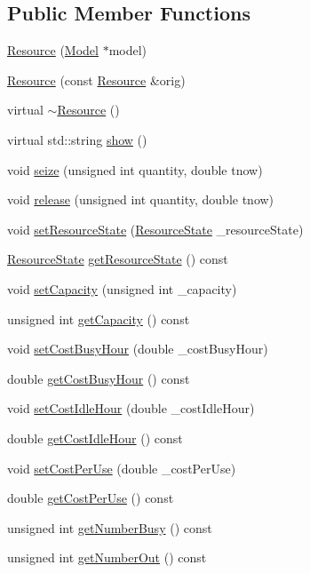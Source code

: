 \subsection*{Public Member Functions}
\begin{DoxyCompactItemize}
\item 
\hyperlink{class_resource_a1a8ae095067797fa47b0241ee278536c}{Resource} (\hyperlink{class_model}{Model} $\ast$model)
\item 
\hyperlink{class_resource_a30f2ca8f0617a6628ebd246b14b50566}{Resource} (const \hyperlink{class_resource}{Resource} \&orig)
\item 
virtual \hyperlink{class_resource_a0e5ec475e2601bdb33644468e86f6f10}{$\sim$\+Resource} ()
\item 
virtual std\+::string \hyperlink{class_resource_a593cf83404dc90706943b4e60213fd01}{show} ()
\item 
void \hyperlink{class_resource_a4c9cc891367f2af07511d8897255d625}{seize} (unsigned int quantity, double tnow)
\item 
void \hyperlink{class_resource_ad5da4dca5dd48a4818827e6273c20c2d}{release} (unsigned int quantity, double tnow)
\item 
void \hyperlink{class_resource_aba60047e3a2400f2aec478b1cfa3647e}{set\+Resource\+State} (\hyperlink{class_resource_af2224610b59962683d3cafbdac10621a}{Resource\+State} \+\_\+resource\+State)
\item 
\hyperlink{class_resource_af2224610b59962683d3cafbdac10621a}{Resource\+State} \hyperlink{class_resource_ac832a54ae1e20a2f7137aefd3a5fc003}{get\+Resource\+State} () const 
\item 
void \hyperlink{class_resource_aa8530e4507ab493de34feb4fef7d4d03}{set\+Capacity} (unsigned int \+\_\+capacity)
\item 
unsigned int \hyperlink{class_resource_a0aa3a9287571af52be298611580e661e}{get\+Capacity} () const 
\item 
void \hyperlink{class_resource_a28c348f8562fcf63e174229e9001f55c}{set\+Cost\+Busy\+Hour} (double \+\_\+cost\+Busy\+Hour)
\item 
double \hyperlink{class_resource_a66bd7e365c6ccb088afad2a6f24afdae}{get\+Cost\+Busy\+Hour} () const 
\item 
void \hyperlink{class_resource_aee4482e9f914b0b4e83cdb4ada50e45e}{set\+Cost\+Idle\+Hour} (double \+\_\+cost\+Idle\+Hour)
\item 
double \hyperlink{class_resource_a8033fb963bed0116f01af2b637bd4cad}{get\+Cost\+Idle\+Hour} () const 
\item 
void \hyperlink{class_resource_adedf8ae8388efb1a194441613647b669}{set\+Cost\+Per\+Use} (double \+\_\+cost\+Per\+Use)
\item 
double \hyperlink{class_resource_a93d303fba82b1ef9879cc75fbafef506}{get\+Cost\+Per\+Use} () const 
\item 
unsigned int \hyperlink{class_resource_a6fafa0b8da75c9596ca52932482a5568}{get\+Number\+Busy} () const 
\item 
unsigned int \hyperlink{class_resource_a1aedd0bf239010a6b7e2a6c15a324481}{get\+Number\+Out} () const 
\end{DoxyCompactItemize}
